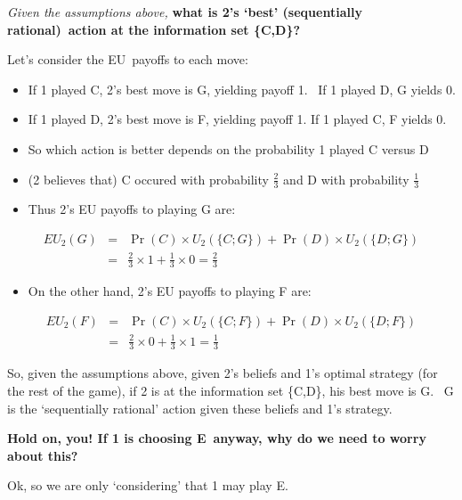 \documentclass{article}
\begin{document}
\bigskip 

\textit{Given the assumptions above, }\textbf{what is 2's `best'
(sequentially rational)\ action at the information set \{C,D\}?}

Let's consider the EU\ payoffs to each move:

\begin{itemize}
\item If 1 played C, 2's best move is G, yielding payoff 1. \ If 1 played D,
G yields 0.

\item If 1 played D, 2's best move is F, yielding payoff 1. If 1 played C, F
yields 0.

\item So which action is better depends on the probability 1 played C versus
D

\item (2 believes that) C occured with probability $\frac{2}{3}$ and D with
probability $\frac{1}{3}$

\item Thus 2's EU payoffs to playing G are:
\end{itemize}

\begin{eqnarray*}
EU_{2}(G) &=&\Pr (C)\times U_{2}(\{C;G\})+\Pr (D)\times U_{2}(\{D;G\}) \\
&=&\frac{2}{3}\times 1+\frac{1}{3}\times 0=\frac{2}{3}
\end{eqnarray*}

\begin{itemize}
\item On the other hand, 2's EU payoffs to playing F are:
\end{itemize}

\begin{eqnarray*}
EU_{2}(F) &=&\Pr (C)\times U_{2}(\{C;F\})+\Pr (D)\times U_{2}(\{D;F\}) \\
&=&\frac{2}{3}\times 0+\frac{1}{3}\times 1=\frac{1}{3}
\end{eqnarray*}

So, given the assumptions above, given 2's beliefs and 1's optimal strategy
(for the rest of the game), if 2 is at the information set \{C,D\}, his best
move is G. \ G is the `sequentially rational' action given these beliefs and
1's strategy.

\bigskip 

\textbf{Hold on, you! If 1 is choosing E\ anyway, why do we need to worry
about this?}

Ok, so we are only `considering' that 1 may play E. \ 
\end{document}
